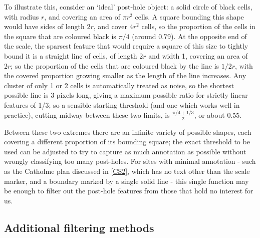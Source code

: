 \documentclass[../../ArchStats.tex]{subfiles}
\begin{document}
To illustrate this, consider an `ideal' post-hole object: a solid circle of black cells, with radius $r$, and covering an area of $\pi r^2$ cells. A square bounding this shape would have sides of length $2r$, and cover $4r^2$ cells, so the proportion of the cells in the square that are coloured black is $\pi/4$ (around 0.79). At the opposite end of the scale, the sparsest feature that would require a square of this size to tightly bound it is a straight line of cells, of length $2r$ and width 1, covering an area of $2r$; so the proportion of the cells that are coloured black by the line is $1/2r$, with the covered proportion growing smaller as the length of the line increases. Any cluster of only 1 or 2 cells is automatically treated as noise, so the shortest possible line is 3 pixels long, giving a maximum possible ratio for strictly linear features of 1/3; so a sensible starting threshold (and one which works well in practice), cutting midway between these two limits, is $\frac{\pi/4+1/3}{2}$, or about 0.55. 

Between these two extremes there are an infinite variety of possible shapes, each covering a different proportion of its bounding square; the exact threshold to be used can be adjusted to try to capture as much annotation as possible without wrongly classifying too many post-holes. For sites with minimal annotation - such as the Catholme plan discussed in \ref{CS2}, which has no text other than the scale marker, and a boundary marked by a single solid line - this single function may be enough to filter out the post-hole features from those that hold no interest for us.














\subsection{Additional filtering methods}
\label{sec:alternative-techniques}
\end{document}
